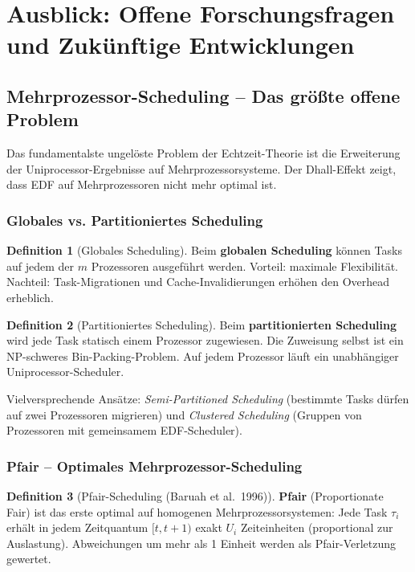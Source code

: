 ﻿\documentclass[a4paper,12pt]{report}
\theoremstyle{definition}
\newtheorem{definition}{Definition}[chapter]
\begin{document}
\section{Ausblick: Offene Forschungsfragen und Zukünftige Entwicklungen}

\subsection{Mehrprozessor-Scheduling -- Das größte offene Problem}

Das fundamentalste ungelöste Problem der Echtzeit-Theorie ist die Erweiterung
der Uniprocessor-Ergebnisse auf Mehrprozessorsysteme. Der Dhall-Effekt zeigt,
dass EDF auf Mehrprozessoren nicht mehr optimal ist.

\subsubsection{Globales vs. Partitioniertes Scheduling}

\begin{definition}[Globales Scheduling]
	Beim \textbf{globalen Scheduling} können Tasks auf jedem der $m$ Prozessoren
	ausgeführt werden. Vorteil: maximale Flexibilität. Nachteil: Task-Migrationen
	und Cache-Invalidierungen erhöhen den Overhead erheblich.
\end{definition}

\begin{definition}[Partitioniertes Scheduling]
	Beim \textbf{partitionierten Scheduling} wird jede Task statisch einem
	Prozessor zugewiesen. Die Zuweisung selbst ist ein NP-schweres Bin-Packing-Problem.
	Auf jedem Prozessor läuft ein unabhängiger Uniprocessor-Scheduler.
\end{definition}

Vielversprechende Ansätze: \emph{Semi-Partitioned Scheduling} (bestimmte Tasks
dürfen auf zwei Prozessoren migrieren) und \emph{Clustered Scheduling} (Gruppen
von Prozessoren mit gemeinsamem EDF-Scheduler).

\subsubsection{Pfair -- Optimales Mehrprozessor-Scheduling}

\begin{definition}[Pfair-Scheduling (Baruah et al.\ 1996)]
	\textbf{Pfair} (Proportionate Fair) ist das erste optimal auf homogenen
	Mehrprozessorsystemen: Jede Task $\tau_i$ erhält in jedem Zeitquantum
	$[t, t+1)$ exakt $U_i$ Zeiteinheiten (proportional zur Auslastung).
	Abweichungen um mehr als 1 Einheit werden als Pfair-Verletzung gewertet.
\end{definition}
\end{document}
